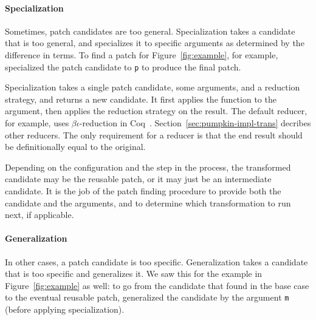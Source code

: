 \paragraph{Specialization}
Sometimes, patch candidates are too general.
Specialization takes a candidate that is too general,
and specializes it to specific arguments as determined by the difference in terms.
To find a patch for Figure~\ref{fig:example}, for example, \sysname
specialized the patch candidate to \lstinline{p} to produce the final patch.

Specialization takes a single patch candidate, some arguments, and a reduction strategy, and returns a new candidate.
It first applies the function to the argument, then applies the reduction strategy on the result.
The default reducer, for example, uses $\beta\iota$-reduction in Coq~\cite{equality}.
Section~\ref{sec:pumpkin-impl-trans} decribes other reducers.
The only requirement for a reducer is that the end result should be definitionally equal to the original.

Depending on the configuration and the step in the process, the transformed candidate may be the reusable patch,
or it may just be an intermediate candidate.
It is the job of the patch finding procedure to provide both the candidate and the arguments,
and to determine which transformation to run next, if applicable.

\iffalse
It works by combining application with reduction, with just one derivation:

\begin{mathpar}
\small
\hfill\fbox{$\Gamma$ $\vdash$ $(t,\ \vec{a},\ \Downarrow{r}) \Downarrow_{s} t'$ }\\

\inferrule[Specialize]
  { \Gamma \vdash t\ \vec{a} \Downarrow_{r} t'}
  { \Gamma \vdash (t,\ \vec{a},\ \Downarrow_{r}) \Downarrow_{s} t'}
\end{mathpar}
There is just one super weird thing I do not even know if I am allowed to do here:
the reduction strategy $\Downarrow_{r}$ is itself a transformation that reduces a term in an arbitrary way.
\fi

\paragraph{Generalization} In other cases, a patch candidate is too specific.
Generalization takes a candidate that is too specific and generalizes it.
We saw this for the example in Figure~\ref{fig:example} as well:
to go from the candidate that \sysname found in the base case to the eventual reusable patch,
\sysname generalized the candidate by the argument \lstinline{m} (before applying specialization).

